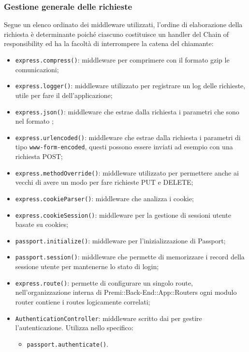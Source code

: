 \subsubsection{Gestione generale delle richieste}\label{generReq}
Segue un elenco ordinato dei middleware utilizzati, l'ordine di elaborazione della richiesta è determinante poiché ciascuno costituisce un handler del  Chain of responsibility ed ha la facoltà di interrompere la catena del chiamante:
\begin{itemize}
\item \texttt{express.compress()}: middleware per comprimere con il formato gzip le comunicazioni;
\item \texttt{express.logger()}: middleware utilizzato per registrare un log delle richieste, utile per
fare il  dell'applicazione;
\item \texttt{express.json()}: middleware che estrae dalla richiesta i parametri che sono nel formato
;
\item \texttt{express.urlencoded()}: middleware che estrae dalla richiesta i parametri di tipo \texttt{www-form-encoded}, questi possono essere inviati ad esempio con una richiesta POST;
\item \texttt{express.methodOverride()}: middleware utilizzato per permettere anche ai vecchi  di avere un modo per fare richieste PUT e DELETE;
\item \texttt{express.cookieParser()}: middleware che analizza i cookie;
\item \texttt{express.cookieSession()}: middleware per la gestione di sessioni utente basate su cookies;
\item \texttt{passport.initialize()}: middleware per l’inizializzazione di Passport;
\item \texttt{passport.session()}: middleware che permette di memorizzare i record della sessione utente per mantenerne lo stato di login;
\item \texttt{express.route()}: permette di configurare un singolo route, nell'organizzazione interna di Premi::Back-End::App::Routers ogni modulo router contiene i routes logicamente correlati;
\item \texttt{AuthenticationController}: middleware scritto dai \rPs per gestire l’autenticazione. Utilizza nello specifico:
\begin{itemize}
\item \texttt{passport.authenticate()}.
\end{itemize}

\end{itemize}
